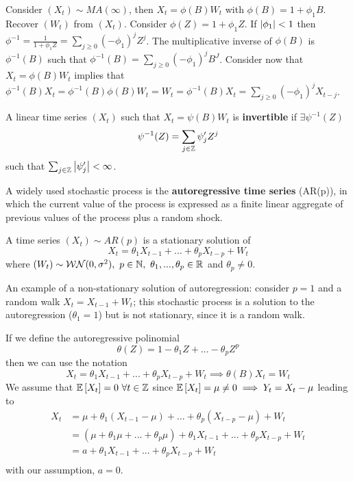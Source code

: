 \begin{example}
    Consider $(X_t)\sim MA(\infty)$, then $X_t=\phi(B)W_t$ with $\phi(B)=1+\phi_1B$. Recover $(W_t)$ from $(X_t)$. Consider $\phi(Z)=1+\phi_1Z$. If $\left|\phi_1\right|<1$ then $\phi^{-1}=\frac{1}{1+\phi_1Z}=\sum_{j\ge0}(-\phi_1)^jZ^j$. The multiplicative inverse of $\phi(B)$ is $\phi^{-1}(B)$ such that $\phi^{-1}(B)=\sum_{j\ge0}(-\phi_1)^jB^J$. Consider now that $X_t=\phi(B)W_t$ implies that $\phi^{-1}(B)X_t=\phi^{-1}(B)\phi(B)W_t=W_t=\phi^{-1}(B)X_t=\sum_{j\ge0}(-\phi_1)^jX_{t-j}$.
\end{example}

\begin{definition}
    A linear time series $(X_t)$ such that $X_t=\psi(B)W_t$ is \textbf{invertible} if $\exists\psi^{-1}(Z)$
    \[
        \psi^{-1}(Z)=\sum_{j\in\mathbb{Z}}\psi_j'Z^j
    \]
    such that $\sum_{j\in\mathbb{Z}}\left|\psi_j'\right|<\infty$.
\end{definition}

A widely used stochastic process is the \textbf{autoregressive time series} (AR(p)), in which the current value of the process is expressed as a finite linear aggregate of previous values of the process plus a random shock.

\begin{definition}
    A time series $(X_t)\sim AR(p)$ is a stationary solution of
    \[
        X_t=\theta_1X_{t-1}+...+\theta_pX_{t-p}+W_t  
    \]
    where $(W_t)\sim\mathcal{WN}(0,\sigma^2),\ p\in\N,\ \theta_1,...,\theta_p\in\R$ and $\theta_p\ne0$.
\end{definition}

\begin{example}
    An example of a non-stationary solution of autoregression: consider $p=1$ and a random walk $X_t=X_{t-1}+W_t$; this stochastic process is a solution to the autoregression ($\theta_1=1$) but is not stationary, since it is a random walk.
\end{example}

If we define the autoregressive polinomial
\[
    \theta(Z)=1-\theta_1Z+...-\theta_pZ^p  
\]
then we can use the notation
\[
    X_t=\theta_1X_{t-1}+...+\theta_pX_{t-p}+W_t\implies\theta(B)X_t=W_t
\]
We assume that $\mathbb{E}\left[X_t\right]=0\ \forall t\in\mathbb{Z}$ since $\mathbb{E}\left[X_t\right]=\mu\ne0\implies Y_t=X_t-\mu$ leading to
\begin{equation*}
    \begin{split}
        X_t&=\mu+\theta_1(X_{t-1}-\mu)+...+\theta_p(X_{t-p}-\mu)+W_t\\
        &=(\mu+\theta_1\mu+...+\theta_p\mu)+\theta_1X_{t-1}+...+\theta_pX_{t-p}+W_t\\
        &=a+\theta_1X_{t-1}+...+\theta_pX_{t-p}+W_t\\
    \end{split}
\end{equation*}
with our assumption, $a=0$.

